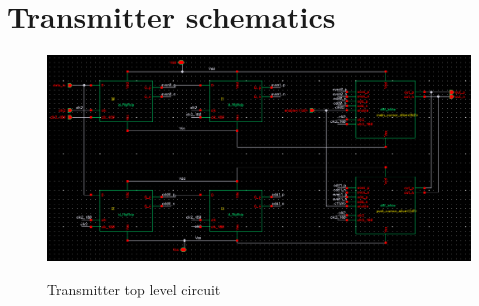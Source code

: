\section{Transmitter schematics}


\begin{figure}[ht]
  \centering
  {\includegraphics[scale=0.55]{img/transmitter.png}}
  \caption{Transmitter top level circuit}
  \label{fig:top_level}
\end{figure}

